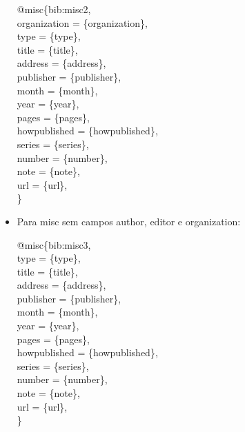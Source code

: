 \documentclass[a4paper,12pt,oneside,onecolumn]{article}
\newcommand{\formato}[1]{\begin{flushleft}{#1}\end{flushleft}}
\begin{document}
\begin{itemize}
\formato{
  @misc\{bib:misc2,\\
    organization = \{organization\},\\
    type = \{type\},\\
    title = \{title\},\\
    address = \{address\},\\
    publisher = \{publisher\},\\
    month = \{month\},\\
    year = \{year\},\\
    pages = \{pages\},\\
    howpublished = \{howpublished\},\\
    series = \{series\},\\
    number = \{number\},\\
    note = \{note\},\\
    url = \{url\},\\
  \}
}

\item Para misc sem campos author, editor e organization: \formato{\citetext{bib:misc3}}

\formato{
  @misc\{bib:misc3,\\
    type = \{type\},\\
    title = \{title\},\\
    address = \{address\},\\
    publisher = \{publisher\},\\
    month = \{month\},\\
    year = \{year\},\\
    pages = \{pages\},\\
    howpublished = \{howpublished\},\\
    series = \{series\},\\
    number = \{number\},\\
    note = \{note\},\\
    url = \{url\},\\
  \}
}
\end{itemize}
\end{document}
